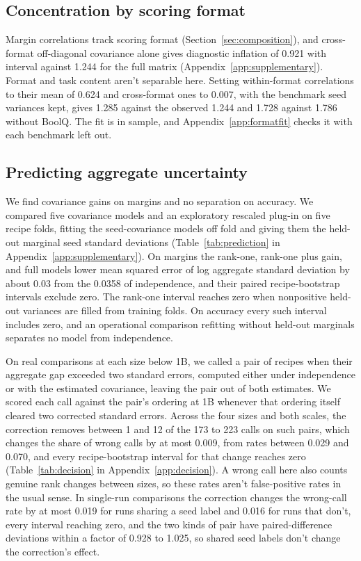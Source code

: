 \subsection{Concentration by scoring format}
Margin correlations track scoring format (Section~\ref{sec:composition}), and cross-format off-diagonal covariance alone gives diagnostic inflation of 0.921 with interval  against 1.244 for the full matrix (Appendix~\ref{app:supplementary}). Format and task content aren't separable here. Setting within-format correlations to their mean of 0.624 and cross-format ones to 0.007, with the benchmark seed variances kept, gives 1.285 against the observed 1.244 and 1.728 against 1.786 without BoolQ. The fit is in sample, and Appendix~\ref{app:formatfit} checks it with each benchmark left out.

\subsection{Predicting aggregate uncertainty}
\label{sec:prediction}
We find covariance gains on margins and no separation on accuracy. We compared five covariance models and an exploratory rescaled plug-in on five recipe folds, fitting the seed-covariance models off fold and giving them the held-out marginal seed standard deviations (Table~\ref{tab:prediction} in Appendix~\ref{app:supplementary}). On margins the rank-one, rank-one plus gain, and full models lower mean squared error of log aggregate standard deviation by about 0.03 from the 0.0358 of independence, and their paired recipe-bootstrap intervals exclude zero. The rank-one interval reaches zero when nonpositive held-out variances are filled from training folds. On accuracy every such interval includes zero, and an operational comparison refitting without held-out marginals separates no model from independence.

On real comparisons at each size below 1B, we called a pair of recipes when their aggregate gap exceeded two standard errors, computed either under independence or with the estimated covariance, leaving the pair out of both estimates. We scored each call against the pair's ordering at 1B whenever that ordering itself cleared two corrected standard errors. Across the four sizes and both scales, the correction removes between 1 and 12 of the 173 to 223 calls on such pairs, which changes the share of wrong calls by at most 0.009, from rates between 0.029 and 0.070, and every recipe-bootstrap interval for that change reaches zero (Table~\ref{tab:decision} in Appendix~\ref{app:decision}). A wrong call here also counts genuine rank changes between sizes, so these rates aren't false-positive rates in the usual sense. In single-run comparisons the correction changes the wrong-call rate by at most 0.019 for runs sharing a seed label and 0.016 for runs that don't, every interval reaching zero, and the two kinds of pair have paired-difference deviations within a factor of 0.928 to 1.025, so shared seed labels don't change the correction's effect.


